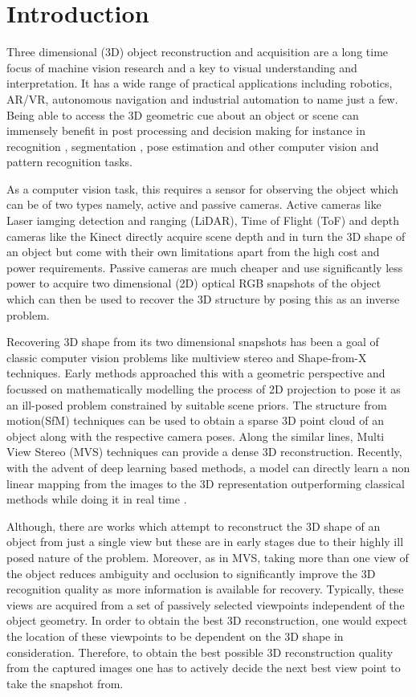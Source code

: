 \section{Introduction}
Three dimensional (3D) object reconstruction and acquisition are a long time focus of machine vision research and a key to visual understanding and interpretation.
It has a wide range of practical applications including robotics, AR/VR, autonomous navigation and industrial automation to name just a few.
Being able to access the 3D geometric cue about an object or scene can immensely benefit in post processing and decision making for instance in recognition \cite{pontil1998support}, segmentation \cite{qi2017pointnet}, pose estimation \cite{andriluka2010monocular} and other computer vision and pattern recognition tasks.

As a computer vision task, this requires a sensor for observing the object which can be of two types namely, active and passive cameras.
Active cameras like Laser iamging detection and ranging (LiDAR), Time of Flight (ToF) and depth cameras like the Kinect directly acquire scene depth and in turn the 3D shape of an object but come with their own limitations apart from the high cost and power requirements.
Passive cameras are much cheaper and use significantly less power to acquire two dimensional (2D) optical RGB snapshots of the object which can then be used to recover the 3D structure by posing this as an inverse problem.

Recovering 3D shape from its two dimensional snapshots has been a goal of classic computer vision problems like multiview stereo and Shape-from-X techniques.
Early methods approached this with a geometric perspective and focussed on mathematically modelling the process of 2D projection to pose it as an ill-posed problem \cite{hartley2003multiple} constrained by suitable scene priors.
The structure from motion(SfM) techniques can be used to obtain a sparse 3D point cloud of an object along with the respective camera poses.
Along the similar lines, Multi View Stereo (MVS) techniques can provide a dense 3D reconstruction.
Recently, with the advent of deep learning based methods, a model can directly learn a non linear mapping from the images to the 3D representation outperforming classical methods while doing it in real time \cite{pix2vox}.

Although, there are works which attempt to reconstruct the 3D shape of an object from just a single view but these are in early stages due to their highly ill posed nature of the problem.
Moreover, as in MVS, taking more than one view of the object reduces ambiguity and occlusion to significantly improve the 3D recognition quality as more information is available for recovery.
Typically, these views are acquired from a set of passively selected viewpoints independent of the object geometry.
In order to obtain the best 3D reconstruction, one would expect the location of these viewpoints to be dependent on the 3D shape in consideration.
Therefore, to obtain the best possible 3D reconstruction quality from the captured images one has to actively decide the next best view point to take the snapshot from.

